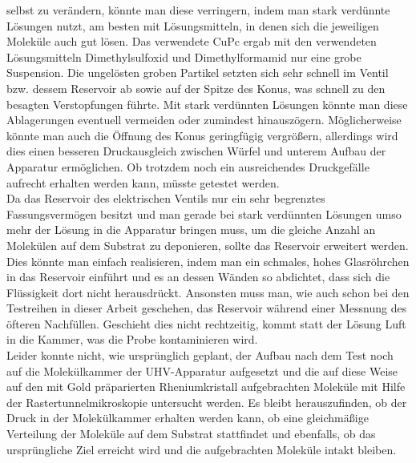 selbst zu verändern, könnte man diese verringern, indem man stark verdünnte Lösungen nutzt, am
besten mit Lösungsmitteln, in denen sich die jeweiligen Moleküle auch gut lösen. Das verwendete CuPc
ergab mit den verwendeten Lösungsmitteln Dimethylsulfoxid und Dimethylformamid nur eine grobe
Suspension. Die ungelösten groben Partikel setzten sich sehr schnell im Ventil bzw. dessem Reservoir
ab sowie auf der Spitze des Konus, was schnell zu den besagten Verstopfungen führte. Mit stark
verdünnten Lösungen könnte man diese Ablagerungen eventuell vermeiden oder zumindest hinauszögern.
Möglicherweise könnte man auch die Öffnung des Konus geringfügig vergrößern, allerdings wird dies
einen besseren Druckausgleich zwischen Würfel und unterem Aufbau der Apparatur ermöglichen. Ob
trotzdem noch ein ausreichendes Druckgefälle aufrecht erhalten werden kann, müsste getestet werden.
\\
Da das Reservoir des elektrischen Ventils nur ein sehr begrenztes Fassungsvermögen besitzt und man
gerade bei stark verdünnten Lösungen umso mehr der Lösung in die Apparatur bringen muss, um die
gleiche Anzahl an Molekülen auf dem Substrat zu deponieren, sollte das Reservoir erweitert werden.
Dies könnte man einfach realisieren, indem man ein schmales, hohes Glasröhrchen in das Reservoir
einführt und es an dessen Wänden so abdichtet, dass sich die Flüssigkeit dort nicht herausdrückt.
Ansonsten muss man, wie auch schon bei den Testreihen in dieser Arbeit geschehen, das Reservoir
während einer Messnung des öfteren Nachfüllen. Geschieht dies nicht rechtzeitig, kommt statt
der Lösung Luft in die Kammer, was die Probe kontaminieren wird.
\\
Leider konnte nicht, wie ursprünglich geplant, der Aufbau nach dem Test noch auf die Molekülkammer
der UHV-Apparatur aufgesetzt und die auf diese Weise auf den mit Gold präparierten Rheniumkristall
aufgebrachten Moleküle mit Hilfe der Rastertunnelmikroskopie untersucht werden. Es bleibt
herauszufinden, ob der Druck in der Molekülkammer erhalten werden kann, ob eine gleichmäßige
Verteilung der Moleküle auf dem Substrat stattfindet und ebenfalls, ob das ursprüngliche Ziel erreicht wird und die aufgebrachten Moleküle intakt bleiben.










